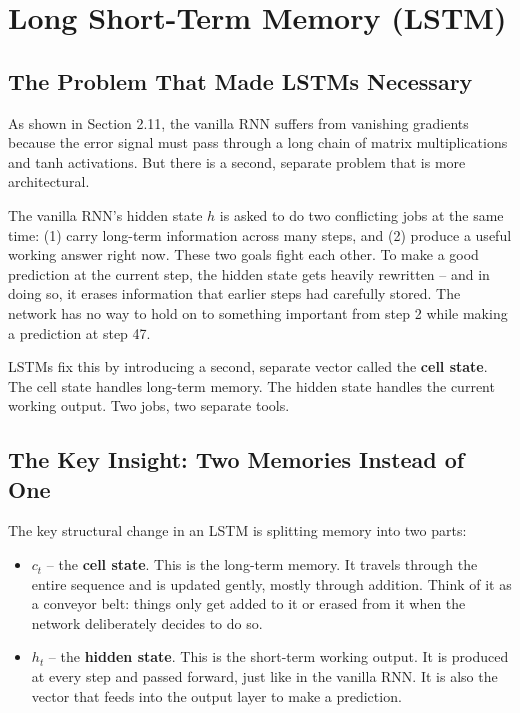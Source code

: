 \section{Long Short-Term Memory (LSTM)}

\subsection{The Problem That Made LSTMs Necessary}

As shown in Section 2.11, the vanilla RNN suffers from vanishing gradients because
the error signal must pass through a long chain of matrix multiplications and tanh
activations. But there is a second, separate problem that is more architectural.

The vanilla RNN's hidden state $h$ is asked to do two conflicting jobs at the same
time: (1) carry long-term information across many steps, and (2) produce a useful
working answer right now. These two goals fight each other. To make a good prediction
at the current step, the hidden state gets heavily rewritten -- and in doing so, it
erases information that earlier steps had carefully stored. The network has no way to
hold on to something important from step 2 while making a prediction at step 47.

LSTMs fix this by introducing a second, separate vector called the \textbf{cell state}.
The cell state handles long-term memory. The hidden state handles the current working
output. Two jobs, two separate tools.

\subsection{The Key Insight: Two Memories Instead of One}

The key structural change in an LSTM is splitting memory into two parts:

\begin{itemize}
    \item $c_t$ -- the \textbf{cell state}. This is the long-term memory. It travels
    through the entire sequence and is updated gently, mostly through addition. Think
    of it as a conveyor belt: things only get added to it or erased from it when
    the network deliberately decides to do so.
    \item $h_t$ -- the \textbf{hidden state}. This is the short-term working output.
    It is produced at every step and passed forward, just like in the vanilla RNN.
    It is also the vector that feeds into the output layer to make a prediction.
\end{itemize}

